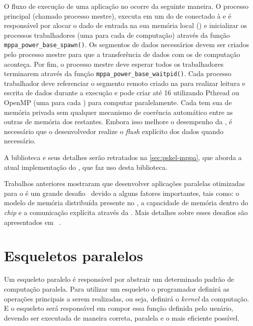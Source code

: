 O fluxo de execução de uma aplicação no \mppa ocorre da seguinte maneira.  O processo principal (chamado processo mestre), executa em um \rman do \cluster de \io conectado à \lpddr e é responsável por alocar o dado de entrada na sua memória local (\lpddr) e inicializar os processos trabalhadores (uma para cada \cluster de computação) através da função \texttt{mppa\_power\_base\_spawn()}. Os segmentos de dados necessários devem ser criados pelo processo mestre para que a transferência de dados com os \clusters de computação aconteça. Por fim, o processo mestre deve esperar todos os trabalhadores terminarem através da função \texttt{mppa\_power\_base\_waitpid()}. Cada processo trabalhador deve referenciar o segmento remoto criado na \lpddr para realizar leitura e escrita de dados durante a execução e pode criar até 16 \threads utilizando Pthread ou OpenMP (uma \thread para cada \pe) para computar paralelamente. Cada \pe tem sua \cache de memória privada sem qualquer mecanismo de coerência automático entre as outras \caches de memória dos \pes restantes. Embora isso melhore o desempenho da \cache, é necessário que o desenvolvedor realize o \textit{flush} explícito dos dados quando necessário. 

A biblioteca \ipc e seus detalhes serão retratados na \autoref{sec:pskel-mppa}, que aborda a atual implementação do \pskelmppa, que faz uso desta biblioteca.

Trabalhos anteriores mostraram que desenvolver aplicações paralelas otimizadas para o \mppa é um grande desafio~\cite{francesquini:hal-01092325} devido a alguns fatores importantes, tais como: o modelo de memória distribuída presente no \mppa, a capacidade de memória dentro do \textit{chip} e a comunicação explícita através da \noc. Mais detalhes sobre esses desafios são apresentados em ~\cite{wscad2017}.


\section{Esqueletos paralelos}
\label{sec:esqueletosparalelos}

Um esqueleto paralelo é responsável por abstrair um determinado padrão de computação paralela. Para utilizar um esqueleto o programador definirá as operações principais a serem realizadas, ou seja, definirá o \textit{kernel} da computação. E o esqueleto será responsável em compor essa função definida pelo usuário, devendo ser executada de maneira correta, paralela e o mais eficiente possível.

